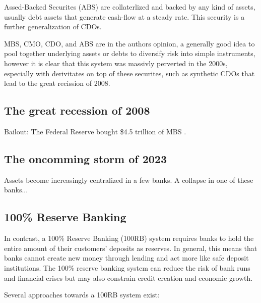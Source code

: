 Assed-Backed Securites (ABS) are collaterlized and backed by any kind of assets, usually debt assets that generate cash-flow at a steady rate. This security is a further generalization of CDOs. 

MBS, CMO, CDO, and ABS are in the authors opinion, a generally good idea to pool together underlying assets or debts to diversify risk into simple instruments, however it is clear that this system was massivly perverted in the 2000s, especially with derivitates on top of these securites, such as synthetic CDOs that lead to the great recission of 2008.

\subsection{The great recession of 2008}

Bailout: The Federal Reserve bought \$4.5 trillion of MBS \cite{MBSInvestopedia}.


\subsection{The oncomming storm of 2023}
Assets become increasingly centralized in a few banks. A collapse in one of these banks...

\subsection{100\% Reserve Banking}
In contrast, a 100\% Reserve Banking (100RB) system requires banks to hold the entire amount of their customers' deposits as reserves. In general, this means that banks cannot create new money through lending and act more like safe deposit institutions. The 100\% reserve banking system can reduce the risk of bank runs and financial crises but may also constrain credit creation and economic growth.

Several approaches towards a 100RB system exist:

